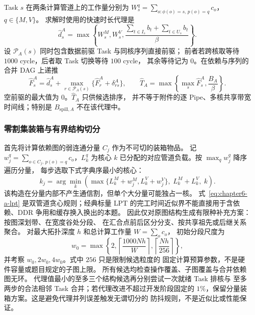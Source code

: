 Task $s$ 在两条计算管道上的工作量分别为
$W_s^q=\sum_{o:\phi(o)=s,\,p(o)=q}c_o$，$q\in\{M,V\}$。
求解时使用的快速时长代理是
\begin{equation}
\widehat d_s^A=\max\left\{W_s^M,W_s^V,
\frac{\sum_{t\in I_s}b_t+\sum_{t\in U_s}b_t}{\beta}\right\}.
\label{eq:chapter6-a-task}
\end{equation}
设 $\mathcal P_A(s)$ 同时包含数据前驱 Task 与同核序列直接前驱；
前者若跨核取等待 $1000$ cycle，后者取 Task 切换等待 $100$ cycle，
其余等待记为 $0$。在依赖与序列的合并 DAG 上递推
\begin{equation}
\widehat F_s^A=\widehat d_s^A+
\max_{r\in\mathcal P_A(s)}\{\widehat F_r^A+\delta^A_{rs}\},
\qquad
\widehat T_A=\max\left\{\max_s\widehat F_s^A,\frac{B_A}{\beta}\right\}.
\label{eq:chapter6-a-proxy}
\end{equation}
空前驱的最大值为 $0$。$\widehat T_A$ 只供候选排序，
并不等于附件的逐 Pipe、多核共享带宽时间线；特别是
$B_{\mathrm{spill},A}$ 不在该代理中。

\subsubsection{零割集装箱与有界结构切分}
首先将计算依赖图的弱连通分量 $C_j$ 作为不可切的装箱物品。
记 $w_j^q=\sum_{o\in C_j,\,p(o)=q}c_o$，$L_k^q$ 为核心 $k$
已分配的对应管道负载。按 $\max_q w_j^q$ 降序遍历分量，
每步选取下式字典序最小的核心：
\begin{equation}
k_j=\arg\min_{k}\left(
\max\{L_k^M+w_j^M,L_k^V+w_j^V\},\;
L_k^M+L_k^V,\;k\right).
\label{eq:chapter6-a-lpt}
\end{equation}
该构造在分量内部不产生通信割，但单个大分量可能独占一核。
式~\eqref{eq:chapter6-a-lpt} 是双管道贪心规则；经典标量 LPT
的完工时间近似界不能直接用于含依赖、DDR 争用和缓存换入换出的本题。
因此仅对原图结构生成有限种补充方案：按图深划带、在宽度谷处分段、
在汇合点前后区分分支、按共享祖先或后继关系聚合。
对最大拓扑深度 $h$ 和总计算工作量 $W=\sum_oc_o$，
初始分段尺度为
\begin{equation}
w_0=\max\left\{2,
\left\lceil\frac{1000Nh}{W}\right\rceil,
\left\lceil\frac{Nh}{256}\right\rceil\right\},
\label{eq:chapter6-a-width}
\end{equation}
并考察 $w_0,2w_0,4w_0$。式中 $256$ 只是限制候选粒度的
固定计算预算参数，不是硬件容量或题目规定的子图上限。
所有候选均检查操作覆盖、子图覆盖与合并依赖图无环。
代理值最小的至多三个结构候选再分别尝试一次就绪 Task 排核与
至多两步的合法相邻 Task 合并；若代理改进不超过开发阶段固定的
$1\%$，保留分量装箱方案。这是避免代理并列误差触发无谓切分的
防抖规则，不是近似比或性能保证。

